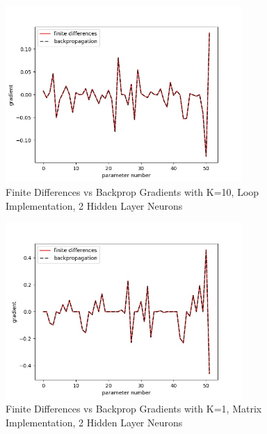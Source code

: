 \documentclass[reqno]{amsart}
\theoremstyle{definition}
\theoremstyle{remark}
\numberwithin{equation}{section}
\begin{document}
\begin{figure}
    \centering
    \includegraphics[width=0.8\textwidth]{gradient_differences_LOOP_k10}
    \caption{Finite Differences vs Backprop Gradients with K=10, Loop Implementation, 2 Hidden Layer Neurons}
    \label{fig:gradient_differences_LOOP_k10}
\end{figure}

\begin{figure}[H]
    \centering
    \includegraphics[width=0.8\textwidth]{gradient_differences_MATRIX_k1}
    \caption{Finite Differences vs Backprop Gradients with K=1, Matrix Implementation, 2 Hidden Layer Neurons}
    \label{fig:gradient_differences_MATRIX_k1}
\end{figure}
\end{document}
